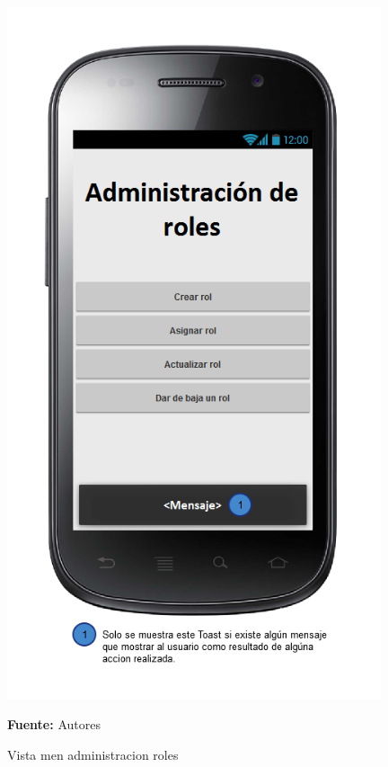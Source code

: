 \begin{figure}[!htb]
  \begin{center}
\includegraphics[width=11cm]{./imagenes/UI/Administracion/menu_administracion_roles.png}
    \caption{Vista men administracion roles}
    \label{fig:Vista_menu_administracion_roles}
    \textbf{Fuente:}  Autores
  \end{center}
\end{figure}
